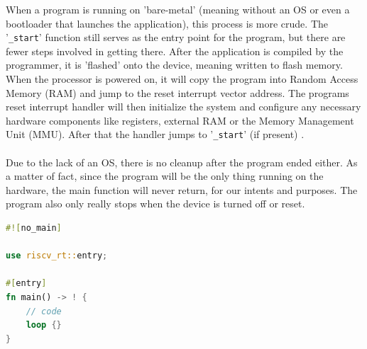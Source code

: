 When a program is running on 'bare-metal' (meaning without an OS or even a bootloader that launches the  application), this process is more crude.
The '\lstinline{_start}' function still serves as the entry point for the program, but there are fewer steps involved in getting there.
After the application is compiled by the programmer, it is 'flashed' onto the device, meaning written to flash memory.
When the processor is powered on, it will copy the program into Random Access Memory (RAM) and jump to the reset interrupt vector address.
The programs reset interrupt handler will then initialize the system and configure any necessary hardware components
like registers, external RAM or the Memory Management Unit (MMU).
After that the handler jumps to '\lstinline{_start}' (if present) \cite{before_main}.\\\\
Due to the lack of an OS, there is no cleanup after the program ended either.
As a matter of fact, since the program will be the only thing running on the hardware,
the main function will never return, for our intents and purposes.
The program also only really stops when the device is turned off or reset.

\begin{minipage}{\textwidth}
\begin{lstlisting}[style=colorEX,language=Rust,caption={Example main function for the pulp-platform},label={code:embedded_main}]
#![no_main]

use riscv_rt::entry;

#[entry]
fn main() -> ! {
    // code
    loop {}
}
\end{lstlisting}
\end{minipage}

